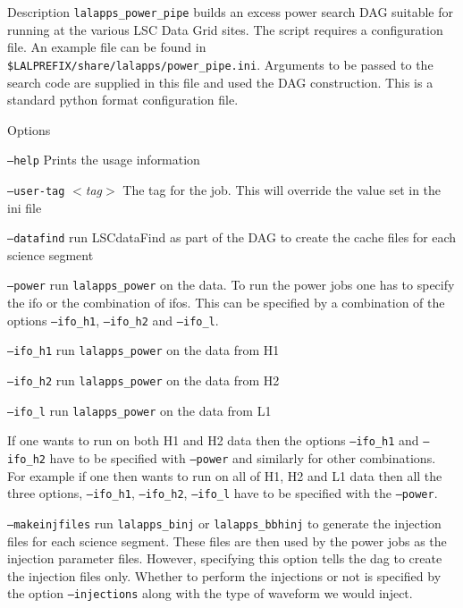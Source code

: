 \documentclass{article}
\newcommand{\prog}[1]{\texttt{#1}}
\newcommand{\option}[1]{\texttt{#1}}
\newcommand{\parm}[1]{$<$\textit{#1}$>$}
\newenvironment{entry}%
  {\begin{list}{}{\renewcommand{\makelabel}[1]%
    {\parbox[b]{\labelwidth}{\makebox[0pt][l]{\textbf{##1}}\\}}%
    \setlength{\labelwidth}{1em}%
    \setlength{\labelsep}{1em}%
    \setlength{\leftmargin}{2em}%
    \setlength{\topsep}{\medskipamount}%
    \setlength{\itemsep}{\medskipamount}%
    \setlength{\parsep}{\medskipamount}%
    \setlength{\listparindent}{0pt}}}
  {\end{list}}
\begin{document}
\begin{entry}
\item[Description] 
\prog{lalapps\_power\_pipe} builds an excess power search DAG suitable for
running at the various LSC Data Grid sites.   The script requires a
configuration file.   An example file can be found in
\texttt{\$LALPREFIX/share/lalapps/power\_pipe.ini}.   Arguments to be
passed to the search code are supplied in this file and used the DAG
construction.  This is a standard python format configuration file.

\item[Options]\leavevmode
\begin{entry}

\item[\option{--help}] Prints the usage information

\item[\option{--user-tag} \parm{tag}]   The tag for the job.  This will
override the value set in the ini file

\item[\option{--datafind}] run LSCdataFind as part of the DAG to create the
cache files for each science segment

\item[\option{--power}] run \prog{lalapps\_power} on the data.  To run
the power jobs one has to specify the ifo or the combination of ifos.  This
can be specified by a combination of the options \option{--ifo\_h1},
 \option{--ifo\_h2} and \option{--ifo\_l}.  

\item[\option{--ifo\_h1}] run \prog{lalapps\_power} on the data from H1

\item[\option{--ifo\_h2}] run \prog{lalapps\_power} on the data from H2

\item[\option{--ifo\_l}] run \prog{lalapps\_power} on the data from L1

If one wants to run on both H1 and H2 data then the options \option{--ifo\_h1}
and \option{--ifo\_h2} have to be specified with \option{--power} and 
similarly for other combinations.  For example if one then wants to run on 
all of H1,  H2 and L1 data then all the three options,  \option{--ifo\_h1},
 \option{--ifo\_h2},  \option{--ifo\_l} have to be specified with the 
\option{--power}.

\item[\option{--makeinjfiles}] run \prog{lalapps\_binj} or 
\prog{lalapps\_bbhinj} to generate the injection files for each science
segment. These files are then used by the power jobs as the injection
parameter files.  However,  specifying this option tells the dag to 
create the injection files only.  Whether to perform the injections or not
is specified by the option \option{--injections} along with the type of 
waveform we would inject.    


\end{entry}
\end{entry}
\end{document}
